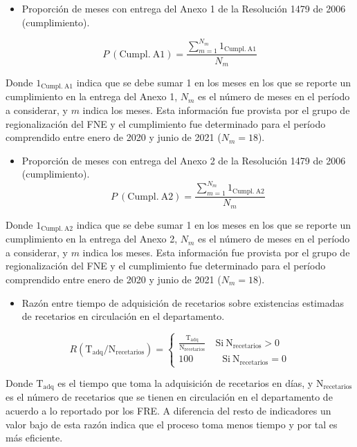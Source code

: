 \documentclass[
]{book}
\providecommand{\tightlist}{%
  \setlength{\itemsep}{0pt}\setlength{\parskip}{0pt}}
\begin{document}
\begin{itemize}
\tightlist
\item
  Proporción de meses con entrega del Anexo 1 de la Resolución 1479 de 2006 (cumplimiento).
\end{itemize}

\[P~\left( \mathrm{Cumpl.~A1}\right) = \frac{\sum^{N_m}_{m = 1}{1_{\mathrm{Cumpl.~A1}}}}{N_m}\]

Donde \(1_{\mathrm{Cumpl.~A1}}\) indica que se debe sumar 1 en los meses en los que se reporte un cumplimiento en la entrega del Anexo 1, \(N_m\) es el número de meses en el período a considerar, y \(m\) indica los meses. Esta información fue provista por el grupo de regionalización del FNE y el cumplimiento fue determinado para el período comprendido entre enero de 2020 y junio de 2021 (\(N_m = 18\)).

\begin{itemize}
\tightlist
\item
  Proporción de meses con entrega del Anexo 2 de la Resolución 1479 de 2006 (cumplimiento).
  \[P~\left( \mathrm{Cumpl.~A2}\right) = \frac{\sum^{N_m}_{m = 1}{1_{\mathrm{Cumpl.~A2}}}}{N_m}\]
\end{itemize}

Donde \(1_{\mathrm{Cumpl.~A2}}\) indica que se debe sumar 1 en los meses en los que se reporte un cumplimiento en la entrega del Anexo 2, \(N_m\) es el número de meses en el período a considerar, y \(m\) indica los meses. Esta información fue provista por el grupo de regionalización del FNE y el cumplimiento fue determinado para el período comprendido entre enero de 2020 y junio de 2021 (\(N_m = 18\)).

\begin{itemize}
\tightlist
\item
  Razón entre tiempo de adquisición de recetarios sobre existencias estimadas de recetarios en circulación en el departamento.
\end{itemize}

\[R \left(\mathrm{T_{adq}}/\mathrm{N_{recetarios}}\right ) = \left\{\begin{matrix}
\frac{\mathrm{T_{adq}}}{\mathrm{N_{recetarios}}}\quad\mathrm{Si}~\mathrm{N_{recetarios}}>0
\\ 100\quad\quad\quad\mathrm{Si}~\mathrm{N_{recetarios}}=0
\end{matrix}\right.
\]

Donde \(\mathrm{T_{adq}}\) es el tiempo que toma la adquisición de recetarios en días, y \(\mathrm{N_{recetarios}}\) es el número de recetarios que se tienen en circulación en el departamento de acuerdo a lo reportado por los FRE. A diferencia del resto de indicadores un valor bajo de esta razón indica que el proceso toma menos tiempo y por tal es más eficiente.
\end{document}
